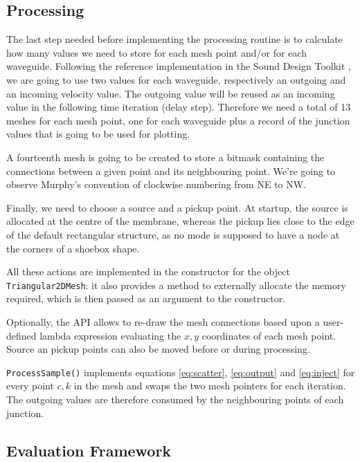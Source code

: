 \documentclass{article}
\begin{document}
\subsection{Processing}

The last step needed before implementing the processing routine is
to calculate how many values we need to store for each mesh point
and/or for each waveguide. Following the reference implementation in
the Sound Design Toolkit \cite{baldan2017sound}, we are going to
use two values for each waveguide, respectively an outgoing and an
incoming velocity value. The outgoing value
will be reused as an incoming value in the following time iteration
(delay step). Therefore we need a total of 13 meshes for each
mesh point, one for each waveguide plus a record of the junction
values that is going to be used for plotting.

A fourteenth mesh is going to be created to store a bitmask
containing the connections between a given point and its
neighbouring point. We're going to observe Murphy's convention
of clockwise numbering from NE to NW.

Finally, we need to choose a source and a pickup point.
At startup, the source is allocated at the centre of the
membrane, whereas the pickup lies close to the edge of
the default rectangular structure, as no mode is supposed to have
a node at the corners of a shoebox shape.

All these actions are implemented in the constructor for the object
\texttt{Triangular2DMesh}: it also provides a method to externally
allocate the memory required, which is then passed as an argument
to the constructor.

Optionally, the API allows to re-draw the mesh connections based
upon a user-defined lambda expression evaluating the \(x, y\)
coordinates of each mesh point. Source an pickup points can also
be moved before or during processing.

\texttt{ProcessSample()} implements equations
\ref{eq:scatter}, \ref{eq:output} and \ref{eq:inject} for
every point \(c, k\) in the mesh and swaps the two mesh pointers
for each iteration. The outgoing values are therefore consumed
by the neighbouring points of each junction.

\subsection{Evaluation Framework}
\end{document}

